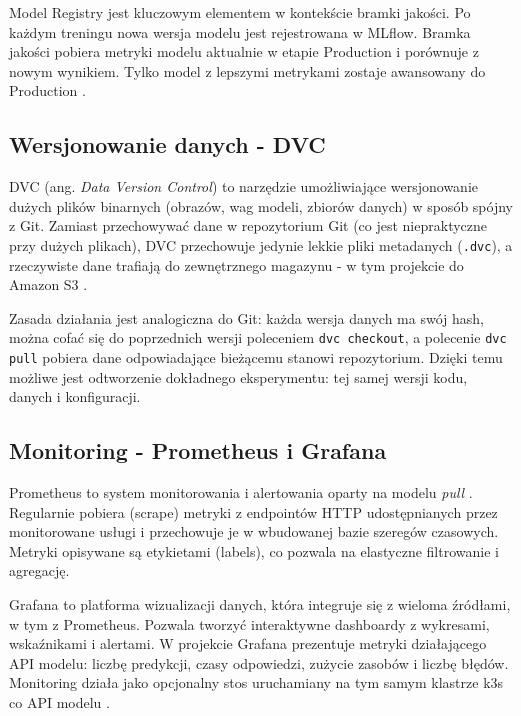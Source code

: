 Model Registry jest kluczowym elementem w kontekście bramki jakości. Po każdym treningu nowa wersja modelu jest rejestrowana w MLflow. Bramka jakości pobiera metryki modelu aktualnie w etapie Production i porównuje z nowym wynikiem. Tylko model z lepszymi metrykami zostaje awansowany do Production \cite{mlflow_model_registry}.

\subsection{Wersjonowanie danych - DVC}

DVC (ang. \textit{Data Version Control}) to narzędzie umożliwiające wersjonowanie dużych plików binarnych (obrazów, wag modeli, zbiorów danych) w sposób spójny z Git. Zamiast przechowywać dane w repozytorium Git (co jest niepraktyczne przy dużych plikach), DVC przechowuje jedynie lekkie pliki metadanych (\texttt{.dvc}), a rzeczywiste dane trafiają do zewnętrznego magazynu - w tym projekcie do Amazon S3 \cite{dvc_docs}.

Zasada działania jest analogiczna do Git: każda wersja danych ma swój hash, można cofać się do poprzednich wersji poleceniem \texttt{dvc checkout}, a polecenie \texttt{dvc pull} pobiera dane odpowiadające bieżącemu stanowi repozytorium. Dzięki temu możliwe jest odtworzenie dokładnego eksperymentu: tej samej wersji kodu, danych i konfiguracji.

\subsection{Monitoring - Prometheus i Grafana}

Prometheus to system monitorowania i alertowania oparty na modelu \textit{pull} \cite{prometheus_docs}. Regularnie pobiera (scrape) metryki z endpointów HTTP udostępnianych przez monitorowane usługi i przechowuje je w wbudowanej bazie szeregów czasowych. Metryki opisywane są etykietami (labels), co pozwala na elastyczne filtrowanie i agregację.

Grafana to platforma wizualizacji danych, która integruje się z wieloma źródłami, w tym z Prometheus. Pozwala tworzyć interaktywne dashboardy z wykresami, wskaźnikami i alertami. W projekcie Grafana prezentuje metryki działającego API modelu: liczbę predykcji, czasy odpowiedzi, zużycie zasobów i liczbę błędów. Monitoring działa jako opcjonalny stos uruchamiany na tym samym klastrze k3s co API modelu \cite{grafana_intro}.
